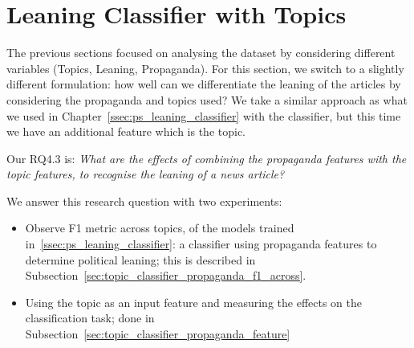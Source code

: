 







\section{\statusgreen Leaning Classifier with Topics}
\label{sec:topic_classifier_propaganda}

The previous sections focused on analysing the dataset by considering different variables (Topics, Leaning, Propaganda).
For this section, we switch to a slightly different formulation: how well can we differentiate the leaning of the articles by considering the propaganda and topics used?
We take a similar approach as what we used in Chapter~\ref{ssec:ps_leaning_classifier} with the classifier, but this time we have an additional feature which is the topic.

Our RQ4.3 is: \emph{What are the effects of combining the propaganda features with the topic
features, to recognise the leaning of a news article?}

We answer this research question with two experiments:

\begin{itemize}
    \item Observe F1 metric across topics, of the models trained in~\ref{ssec:ps_leaning_classifier}: a classifier using propaganda features to determine political leaning; this is described in Subsection~\ref{sec:topic_classifier_propaganda_f1_across}.
    \item Using the topic as an input feature and measuring the effects on the classification task; done in Subsection~\ref{sec:topic_classifier_propaganda_feature}
\end{itemize}



